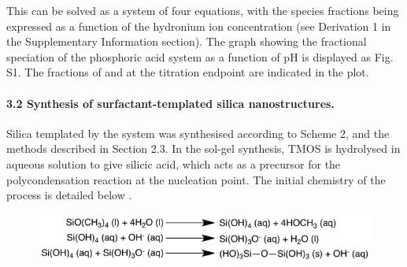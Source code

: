 \documentclass[a4paper,12pt,twocolumn]{article}
\begin{document}
  	This can be solved as a system of four equations, with the species fractions being expressed as a function of the hydronium ion concentration (see Derivation 1 in the Supplementary Information section). The graph showing the fractional speciation of the phosphoric acid system as a function of pH is displayed as Fig. S1. The fractions of  and  at the titration endpoint are indicated in the plot.
  	
  	\paragraph{3.2 Synthesis of surfactant-templated silica nanostructures.} Silica templated by the  system was synthesised according to Scheme 2, and the methods described in Section 2.3. In the sol-gel synthesis, TMOS is hydrolysed in aqueous solution to give silicic acid, which acts as a precursor for the polycondensation reaction at the nucleation point. The initial chemistry of the process is detailed below \cite{yang2008}. 
  	
  	\begin{figure}[!h]
		\includegraphics[width=\linewidth]{mechanism.png}
  	\end{figure}
  	
\end{document}
